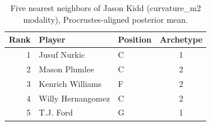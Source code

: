 \begin{table}[htbp]
  \centering\small
  \begin{tabular}{rllc}
    \toprule
    Rank & Player & Position & Archetype \\
    \midrule
    1 & Jusuf Nurkic & C & 1 \\
    2 & Mason Plumlee & C & 2 \\
    3 & Kenrich Williams & F & 2 \\
    4 & Willy Hernangomez & C & 2 \\
    5 & T.J. Ford & G & 1 \\
    \bottomrule
  \end{tabular}
  \caption{Five nearest neighbors of Jason Kidd (curvature_m2 modality), Procrustes-aligned posterior mean.}
  \label{tab:Jason_Kidd_neighbors_curvature_m2}
\end{table}

